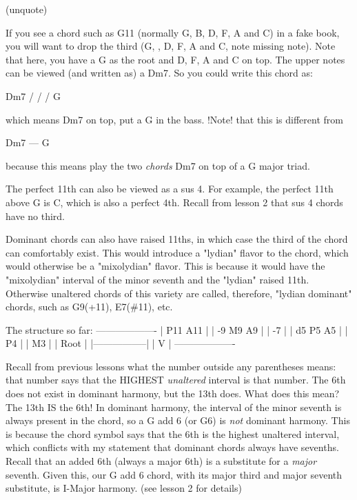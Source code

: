 (unquote)

If you see a chord such as G11 (normally G, B, D, F, A and C) in a fake book,
you will want to drop the third (G,  , D, F, A and C, note missing note). Note 
that here, you have a G as the root and D, F, A and C on top. The upper notes 
can be viewed (and written as) a Dm7. So you could write this chord as:

                Dm7 /
                   /
                  /  G

which means Dm7 on top, put a G in the bass. !Note! that this is different from

              Dm7
              ---
               G

because this means play the two \emph{chords} Dm7 on top of a G major triad.

The perfect 11th can also be viewed as a sus 4. For example, the perfect 11th
above G is C, which is also a perfect 4th. Recall from lesson 2 that sus 4
chords have no third.

Dominant chords can also have raised 11ths, in which case the third of the
chord can comfortably exist. This would introduce a "lydian" flavor to the
chord, which would otherwise be a "mixolydian" flavor. This is because it
would have the "mixolydian" interval of the minor seventh and the "lydian"
raised 11th. Otherwise unaltered chords of this variety are called, therefore,
"lydian dominant" chords, such as G9(+11), E7(\#11), etc.

The structure so far:
-------------------
|      P11  A11   |
| -9    M9   A9   |
|       -7        |
|  d5   P5   A5   |
|       P4        |
|       M3        |
|      Root       |
|-----------------|
|        V        |
-------------------

Recall from previous lessons what the number outside any parentheses means:
that number says that the HIGHEST \emph{unaltered} interval is that number. The
6th does not exist in dominant harmony, but the 13th does. What does this
mean? The 13th IS the 6th! In dominant harmony, the interval of the minor
seventh is always present in the chord, so a G add 6 (or G6) is \emph{not} dominant
harmony. This is because the chord symbol says that the 6th is the highest
unaltered interval, which conflicts with my statement that dominant chords
always have sevenths. Recall that an added 6th (always a major 6th) is a
substitute for a \emph{major} seventh. Given this, our G add 6 chord, with its
major third and major seventh substitute, is I-Major harmony. (see lesson
2 for details)

